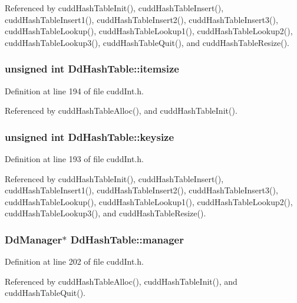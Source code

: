 Referenced by cudd\-Hash\-Table\-Init(), cudd\-Hash\-Table\-Insert(), cudd\-Hash\-Table\-Insert1(), cudd\-Hash\-Table\-Insert2(), cudd\-Hash\-Table\-Insert3(), cudd\-Hash\-Table\-Lookup(), cudd\-Hash\-Table\-Lookup1(), cudd\-Hash\-Table\-Lookup2(), cudd\-Hash\-Table\-Lookup3(), cudd\-Hash\-Table\-Quit(), and cudd\-Hash\-Table\-Resize().
\subsubsection{\setlength{\rightskip}{0pt plus 5cm}unsigned int \bf{Dd\-Hash\-Table::itemsize}}\label{structDdHashTable_2026671f87d19816564455bee089eb31}




Definition at line 194 of file cudd\-Int.h.

Referenced by cudd\-Hash\-Table\-Alloc(), and cudd\-Hash\-Table\-Init().
\subsubsection{\setlength{\rightskip}{0pt plus 5cm}unsigned int \bf{Dd\-Hash\-Table::keysize}}\label{structDdHashTable_1fad0c272a6a1f5b9100cec4a0f88016}




Definition at line 193 of file cudd\-Int.h.

Referenced by cudd\-Hash\-Table\-Init(), cudd\-Hash\-Table\-Insert(), cudd\-Hash\-Table\-Insert1(), cudd\-Hash\-Table\-Insert2(), cudd\-Hash\-Table\-Insert3(), cudd\-Hash\-Table\-Lookup(), cudd\-Hash\-Table\-Lookup1(), cudd\-Hash\-Table\-Lookup2(), cudd\-Hash\-Table\-Lookup3(), and cudd\-Hash\-Table\-Resize().
\subsubsection{\setlength{\rightskip}{0pt plus 5cm}\bf{Dd\-Manager}$\ast$ \bf{Dd\-Hash\-Table::manager}}\label{structDdHashTable_0b0d7198e45a921325f74a366586fd7d}




Definition at line 202 of file cudd\-Int.h.

Referenced by cudd\-Hash\-Table\-Alloc(), cudd\-Hash\-Table\-Init(), and cudd\-Hash\-Table\-Quit().

